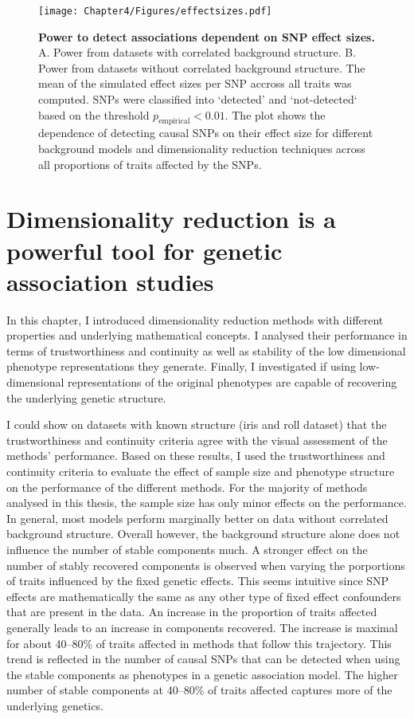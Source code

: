\begin{figure}[hbtp]
	\centering
	\texttt{[image: Chapter4/Figures/effectsizes.pdf]}
	\caption[\textbf{Power to detect associations dependent on SNP effect sizes.}]{\textbf{Power to detect associations dependent on SNP effect sizes. } A. Power from datasets with correlated background structure. B. Power from datasets without correlated background structure. The mean of the simulated effect sizes per SNP accross all traits was computed. SNPs were classified into `detected' and `not-detected` based on the threshold \(p_\text{empirical} < 0.01\). The plot shows the dependence of detecting causal SNPs on their effect size for different background models and dimensionality reduction techniques across all proportions of traits affected by the SNPs.} 
	 	\label{fig:effectsizes-dimRed}
\end{figure}

\section{Dimensionality reduction is a powerful tool for genetic association studies}
In this chapter, I introduced  dimensionality reduction methods with different properties and underlying mathematical concepts. I analysed their performance in terms of trustworthiness and continuity as well as stability of the low dimensional phenotype representations they generate. Finally, I investigated if using low-dimensional representations of the original phenotypes are capable of recovering the underlying genetic structure. 

I could show on datasets with known structure (iris and roll dataset) that the trustworthiness and continuity criteria agree with the visual assessment of the methods' performance. Based on these results, I used the trustworthiness and continuity criteria to evaluate the effect of sample size and phenotype structure on the performance of the different methods. For the majority of methods analysed in this thesis, the sample size has only minor effects on the performance. In general, most models perform marginally better on data without correlated background structure. Overall however, the background structure alone does not influence the number of stable components much. A stronger effect on the number of stably recovered components is observed when varying the porportions of traits influenced by the fixed genetic effects. This seems intuitive since SNP effects are mathematically the same as any other type of fixed effect confounders that are present in the data. An increase in the proportion of traits affected generally leads to an increase in components recovered. The increase is maximal for about \numrange{40}{80}\% of traits affected in methods that follow this trajectory. This trend is reflected in the number of causal SNPs that can be detected when using the stable components as phenotypes in a genetic association model. The higher number of stable components at \numrange{40}{80}\% of traits affected captures more of the underlying genetics. 

